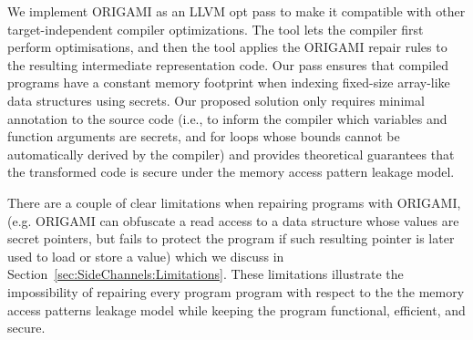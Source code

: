 We implement ORIGAMI as an LLVM opt pass to make it compatible with other target-independent compiler optimizations. The tool lets the compiler first perform optimisations, and then the tool applies the ORIGAMI repair rules to the resulting intermediate representation code. Our pass ensures that compiled programs have a constant memory footprint when indexing fixed-size array-like data structures using secrets. Our proposed solution only requires minimal annotation to the source code (i.e., to inform the compiler which variables and function arguments are secrets, and for loops whose bounds cannot be automatically derived by the compiler) and provides theoretical guarantees that the transformed code is secure under the memory access pattern leakage model. 

There are a couple of clear limitations when repairing programs with ORIGAMI, (e.g. ORIGAMI can obfuscate a read access to a data structure whose values are secret pointers, but fails to protect the program if such resulting pointer is later used to load or store a value) which we discuss in Section~\ref{sec:SideChannels:Limitations}. These limitations illustrate the impossibility of repairing every program program with respect to the the memory access patterns leakage model while keeping the program functional, efficient, and secure. 






